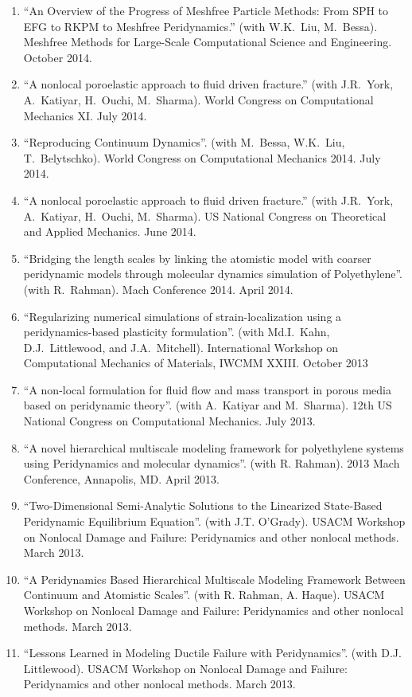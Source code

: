 \begin{etaremune}
\begin{enumerate}
    \item ``An Overview of the Progress of Meshfree Particle Methods: From SPH to EFG to RKPM to Meshfree Peridynamics.'' (with W.K.~Liu, M.~Bessa). Meshfree Methods for Large-Scale Computational Science and Engineering. October 2014.
    \item ``A nonlocal poroelastic approach to fluid driven fracture.'' (with J.R.~York, A.~Katiyar, H.~Ouchi, M.~Sharma). World Congress on Computational Mechanics XI.  July 2014.
    \item ``Reproducing Continuum Dynamics''. (with M.~Bessa, W.K.~Liu, T.~Belytschko). World Congress on Computational Mechanics 2014.  July 2014.
    \item ``A nonlocal poroelastic approach to fluid driven fracture.'' (with J.R.~York, A.~Katiyar, H.~Ouchi, M.~Sharma). US National Congress on Theoretical and Applied Mechanics.  June 2014.
    \item ``Bridging the length scales by linking the atomistic model with coarser peridynamic models through molecular dynamics simulation of Polyethylene''. (with R.~Rahman). Mach Conference 2014.  April 2014.
    \item ``Regularizing numerical simulations of strain-localization using a peridynamics-based plasticity formulation''. (with Md.I.~Kahn, D.J.~Littlewood, and J.A.~Mitchell). International Workshop on Computational Mechanics of Materials, IWCMM XXIII. October 2013
    \item ``A non-local formulation for fluid flow and mass transport in porous media based on peridynamic theory''. (with A.~Katiyar and M.~Sharma). 12th US National Congress on Computational Mechanics. July 2013.
    \item ``A novel hierarchical multiscale modeling framework for polyethylene systems using Peridynamics and molecular dynamics''. (with R. Rahman). 2013 Mach Conference, Annapolis, MD. April 2013. 
    \item ``Two-Dimensional Semi-Analytic Solutions to the Linearized State-Based Peridynamic Equilibrium Equation''. (with J.T. O'Grady). USACM Workshop on Nonlocal Damage and Failure: Peridynamics and other nonlocal methods. March 2013.
    \item ``A Peridynamics Based Hierarchical Multiscale Modeling Framework Between Continuum and Atomistic Scales''. (with R. Rahman, A. Haque). USACM Workshop on Nonlocal Damage and Failure: Peridynamics and other nonlocal methods. March 2013.
    \item ``Lessons Learned in Modeling Ductile Failure with Peridynamics''. (with D.J. Littlewood). USACM Workshop on Nonlocal Damage and Failure: Peridynamics and other nonlocal methods. March 2013.

\end{enumerate}
\end{etaremune}
